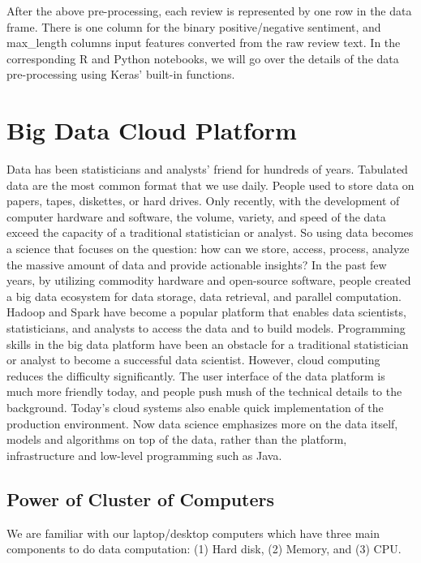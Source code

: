 \documentclass[12pt,]{krantz}
\begin{document}
After the above pre-processing, each review is represented by one row in the data frame. There is one column for the binary positive/negative sentiment, and max\_length columns input features converted from the raw review text. In the corresponding R and Python notebooks, we will go over the details of the data pre-processing using Keras' built-in functions.

\hypertarget{big-data-cloud-platform}{%
\chapter{Big Data Cloud Platform}\label{big-data-cloud-platform}}

Data has been statisticians and analysts' friend for hundreds of years. Tabulated data are the most common format that we use daily. People used to store data on papers, tapes, diskettes, or hard drives. Only recently, with the development of computer hardware and software, the volume, variety, and speed of the data exceed the capacity of a traditional statistician or analyst. So using data becomes a science that focuses on the question: how can we store, access, process, analyze the massive amount of data and provide actionable insights? In the past few years, by utilizing commodity hardware and open-source software, people created a big data ecosystem for data storage, data retrieval, and parallel computation. Hadoop and Spark have become a popular platform that enables data scientists, statisticians, and analysts to access the data and to build models. Programming skills in the big data platform have been an obstacle for a traditional statistician or analyst to become a successful data scientist. However, cloud computing reduces the difficulty significantly. The user interface of the data platform is much more friendly today, and people push mush of the technical details to the background. Today's cloud systems also enable quick implementation of the production environment. Now data science emphasizes more on the data itself, models and algorithms on top of the data, rather than the platform, infrastructure and low-level programming such as Java.

\hypertarget{power-of-cluster-of-computers}{%
\section{Power of Cluster of Computers}\label{power-of-cluster-of-computers}}

We are familiar with our laptop/desktop computers which have three main components to do data computation: (1) Hard disk, (2) Memory, and (3) CPU.
\end{document}
